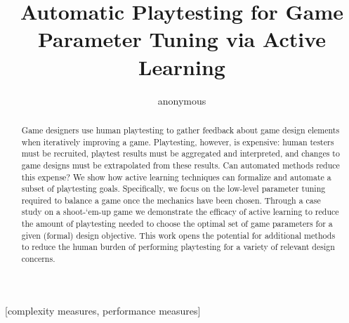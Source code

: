 \documentclass{sig-alternate}
\begin{document}
%

\title{Automatic Playtesting for Game Parameter Tuning via Active Learning}



\author{
\alignauthor
anonymous
}


\maketitle
\begin{abstract}
Game designers use human playtesting to gather feedback about game design elements when iteratively improving a game.
Playtesting, however, is expensive: human testers must be recruited, playtest results must be aggregated and interpreted, and changes to game designs must be extrapolated from these results.
Can automated methods reduce this expense?
We show how active learning techniques can formalize and automate a subset of playtesting goals.
Specifically, we focus on the low-level parameter tuning required to balance a game once the mechanics have been chosen.
Through a case study on a shoot-`em-up game we demonstrate the efficacy of active learning to reduce the amount of playtesting needed to choose the optimal set of game parameters for a given (formal) design objective.
This work opens the potential for additional methods to reduce the human burden of performing playtesting for a variety of relevant design concerns.
\end{abstract}

[complexity measures, performance measures]
\end{document}
